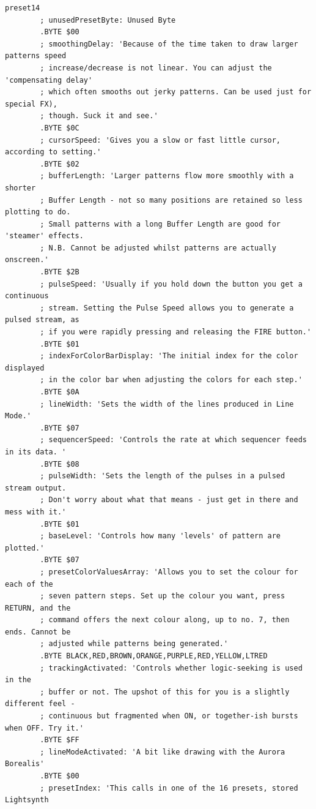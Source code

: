 \begin{lstlisting}[basicstyle=\tiny,caption=Source code for Preset 14.]
preset14
        ; unusedPresetByte: Unused Byte
        .BYTE $00
        ; smoothingDelay: 'Because of the time taken to draw larger patterns speed
        ; increase/decrease is not linear. You can adjust the 'compensating delay'
        ; which often smooths out jerky patterns. Can be used just for special FX),
        ; though. Suck it and see.'
        .BYTE $0C
        ; cursorSpeed: 'Gives you a slow or fast little cursor, according to setting.'
        .BYTE $02
        ; bufferLength: 'Larger patterns flow more smoothly with a shorter
        ; Buffer Length - not so many positions are retained so less plotting to do.
        ; Small patterns with a long Buffer Length are good for 'steamer' effects.
        ; N.B. Cannot be adjusted whilst patterns are actually onscreen.'
        .BYTE $2B
        ; pulseSpeed: 'Usually if you hold down the button you get a continuous
        ; stream. Setting the Pulse Speed allows you to generate a pulsed stream, as
        ; if you were rapidly pressing and releasing the FIRE button.'
        .BYTE $01
        ; indexForColorBarDisplay: 'The initial index for the color displayed
        ; in the color bar when adjusting the colors for each step.'
        .BYTE $0A
        ; lineWidth: 'Sets the width of the lines produced in Line Mode.'
        .BYTE $07
        ; sequencerSpeed: 'Controls the rate at which sequencer feeds in its data. '
        .BYTE $08
        ; pulseWidth: 'Sets the length of the pulses in a pulsed stream output.
        ; Don't worry about what that means - just get in there and mess with it.'
        .BYTE $01
        ; baseLevel: 'Controls how many 'levels' of pattern are plotted.'
        .BYTE $07
        ; presetColorValuesArray: 'Allows you to set the colour for each of the
        ; seven pattern steps. Set up the colour you want, press RETURN, and the
        ; command offers the next colour along, up to no. 7, then ends. Cannot be
        ; adjusted while patterns being generated.'
        .BYTE BLACK,RED,BROWN,ORANGE,PURPLE,RED,YELLOW,LTRED
        ; trackingActivated: 'Controls whether logic-seeking is used in the
        ; buffer or not. The upshot of this for you is a slightly different feel -
        ; continuous but fragmented when ON, or together-ish bursts when OFF. Try it.'
        .BYTE $FF
        ; lineModeActivated: 'A bit like drawing with the Aurora Borealis'
        .BYTE $00
        ; presetIndex: 'This calls in one of the 16 presets, stored Lightsynth

\end{lstlisting}

